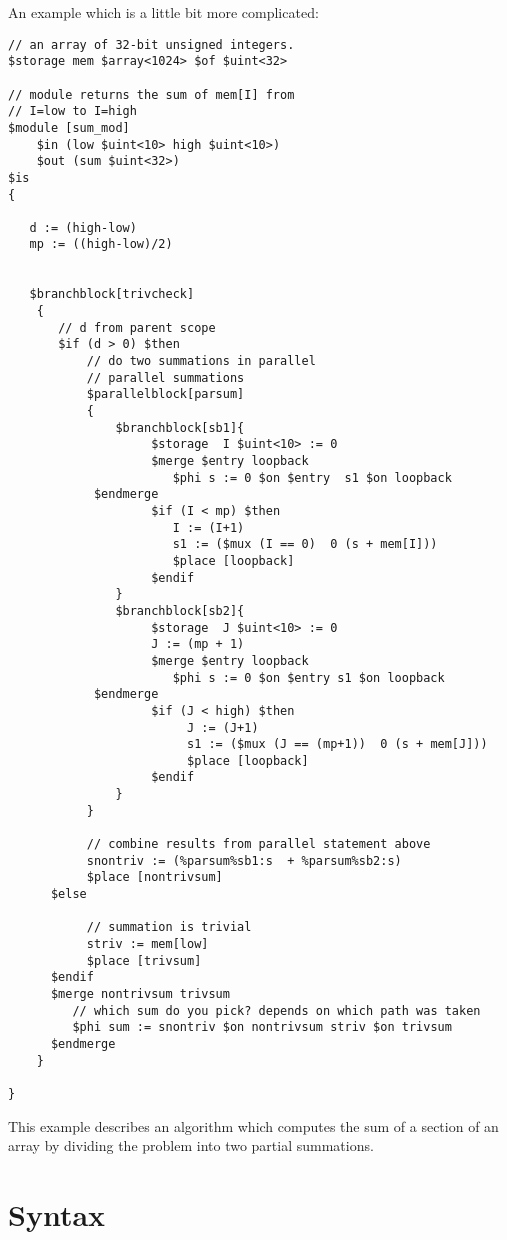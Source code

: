 \documentclass{article}
\begin{document}
An example which is a little bit more complicated:
\begin{verbatim}
// an array of 32-bit unsigned integers.
$storage mem $array<1024> $of $uint<32> 

// module returns the sum of mem[I] from
// I=low to I=high
$module [sum_mod]
    $in (low $uint<10> high $uint<10>)
    $out (sum $uint<32>)
$is
{
 
   d := (high-low)  
   mp := ((high-low)/2)


   $branchblock[trivcheck]
    {
       // d from parent scope
       $if (d > 0) $then  
           // do two summations in parallel
           // parallel summations
           $parallelblock[parsum]
           {
               $branchblock[sb1]{
                    $storage  I $uint<10> := 0
                    $merge $entry loopback
                       $phi s := 0 $on $entry  s1 $on loopback
		    $endmerge
                    $if (I < mp) $then
                       I := (I+1)
                       s1 := ($mux (I == 0)  0 (s + mem[I]))
                       $place [loopback]
                    $endif
               } 
               $branchblock[sb2]{
                    $storage  J $uint<10> := 0
                    J := (mp + 1)
                    $merge $entry loopback
                       $phi s := 0 $on $entry s1 $on loopback
		    $endmerge
                    $if (J < high) $then
                         J := (J+1)
                         s1 := ($mux (J == (mp+1))  0 (s + mem[J]))
                         $place [loopback]
                    $endif
               } 
           }
 
           // combine results from parallel statement above
           snontriv := (%parsum%sb1:s  + %parsum%sb2:s)
           $place [nontrivsum]
      $else

           // summation is trivial 
           striv := mem[low]
           $place [trivsum]
      $endif
      $merge nontrivsum trivsum
         // which sum do you pick? depends on which path was taken
         $phi sum := snontriv $on nontrivsum striv $on trivsum
      $endmerge
    }

}
\end{verbatim}
This example describes an algorithm which computes the sum of
a section of an array by dividing the problem into two partial
summations. 

\section{Syntax} \label{sec:Syntax}
\end{document}
